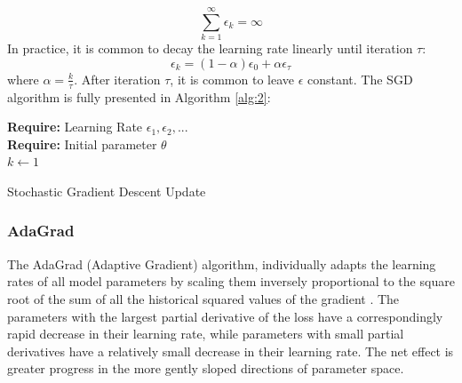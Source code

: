     \begin{equation}
        \sum_{k=1}^\infty \epsilon_k = \infty
    \end{equation}
    In practice, it is common to decay the learning rate linearly until iteration $\tau$:
    \begin{equation}
        \epsilon_k=(1-\alpha)\epsilon_0+\alpha \epsilon_\tau
    \end{equation}
    where $\alpha = \frac{k}{\tau}$. After iteration $\tau$, it is common to leave $\epsilon$ constant.
    The SGD algorithm is fully presented in Algorithm \ref{alg:2}:
 \vspace{5mm}
    \par
            \begin{algorithm}[H]\label{alg:2}
            \textbf{Require:} Learning Rate $\epsilon_1,\epsilon_2,...$ \\
            \textbf{Require:} Initial parameter $\theta$ \\
                $k \gets 1$ \\
            
            \caption{Stochastic Gradient Descent Update}
            \end{algorithm}

    
    
    \subsubsection{AdaGrad}
    The AdaGrad (Adaptive Gradient) algorithm, individually adapts the learning
    rates of all model parameters by scaling them inversely proportional to the square
    root of the sum of all the historical squared values of the gradient \cite{Duchi:2011:ASM:1953048.2021068}. 
    The parameters with the largest partial derivative of the loss have a
    correspondingly rapid decrease in their learning rate, while parameters with small
    partial derivatives have a relatively small decrease in their learning rate. The net
    effect is greater progress in the more gently sloped directions of parameter space.
    
